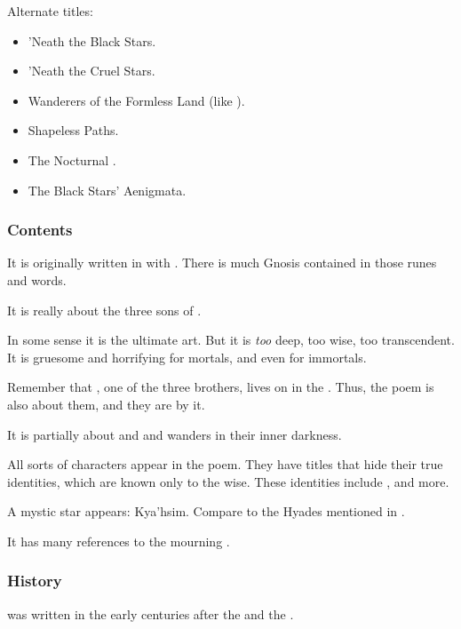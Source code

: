 Alternate titles:
\begin{itemize}
  \item 'Neath the Black Stars. 
  \item 'Neath the Cruel Stars. 
  \item Wanderers of the Formless Land (like ). 
  \item Shapeless Paths. 
  \item The Nocturnal . 
  \item The Black Stars' Aenigmata. 
\end{itemize}





\subsubsection{Contents}
It is originally written in  with . 
There is much Gnosis contained in those runes and words. 

It is really about the three sons of . 

In some sense it is the ultimate art. But it is \emph{too} deep, too wise, too transcendent. It is gruesome and horrifying for mortals, and even for immortals.

Remember that \Nexagglachel, one of the three brothers, lives on in the \satharioth. Thus, the poem is also about them, and they are  by it. 

It is partially about \Nexagglachel{} and  and wanders in their inner darkness.

All sorts of characters appear in the poem. They have titles that hide their true identities, which are known only to the wise. These identities include \Ishnaruchaefir, \Secherdamon{} and more. 

A mystic star appears: Kya'hsim. 
Compare to the Hyades mentioned in \RWCTKIY. 

It has many references to the mourning . 





\subsubsection{History}
\WanderersInDarknessEmph was written in the early centuries after the \secondbanewar and the \Shrouding. 

